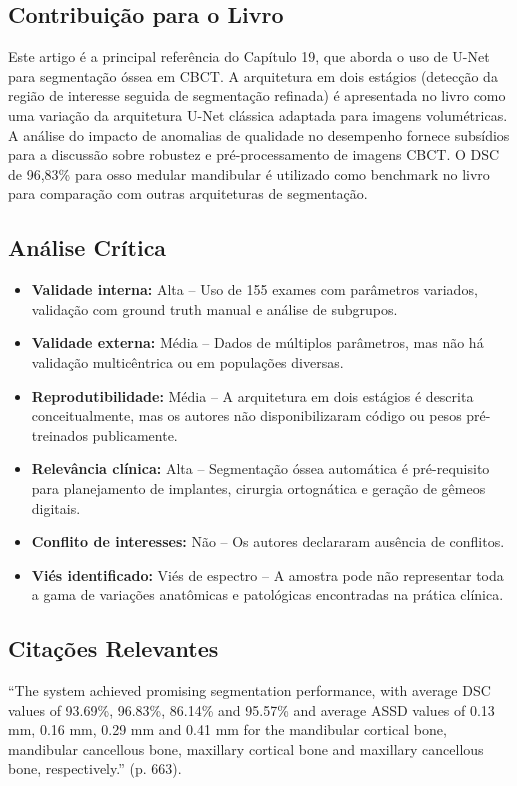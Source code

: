 \subsection{Contribuição para o Livro}
Este artigo é a principal referência do Capítulo 19, que aborda o uso de U-Net
para segmentação óssea em CBCT. A arquitetura em dois estágios (detecção da
região de interesse seguida de segmentação refinada) é apresentada no livro
como uma variação da arquitetura U-Net clássica adaptada para imagens
volumétricas. A análise do impacto de anomalias de qualidade no desempenho
fornece subsídios para a discussão sobre robustez e pré-processamento de
imagens CBCT. O DSC de 96,83\% para osso medular mandibular é utilizado como
benchmark no livro para comparação com outras arquiteturas de segmentação.

\subsection{Análise Crítica}
\begin{itemize}
  \item \textbf{Validade interna:} Alta -- Uso de 155 exames com parâmetros
        variados, validação com ground truth manual e análise de subgrupos.
  \item \textbf{Validade externa:} Média -- Dados de múltiplos parâmetros, mas
        não há validação multicêntrica ou em populações diversas.
  \item \textbf{Reprodutibilidade:} Média -- A arquitetura em dois estágios é
        descrita conceitualmente, mas os autores não disponibilizaram código
        ou pesos pré-treinados publicamente.
  \item \textbf{Relevância clínica:} Alta -- Segmentação óssea automática é
        pré-requisito para planejamento de implantes, cirurgia ortognática e
        geração de gêmeos digitais.
  \item \textbf{Conflito de interesses:} Não -- Os autores declararam ausência de
        conflitos.
  \item \textbf{Viés identificado:} Viés de espectro -- A amostra pode não
        representar toda a gama de variações anatômicas e patológicas
        encontradas na prática clínica.
\end{itemize}

\subsection{Citações Relevantes}
\begin{citacao}
``The system achieved promising segmentation performance, with average DSC
values of 93.69\%, 96.83\%, 86.14\% and 95.57\% and average ASSD values of
0.13 mm, 0.16 mm, 0.29 mm and 0.41 mm for the mandibular cortical bone,
mandibular cancellous bone, maxillary cortical bone and maxillary cancellous
bone, respectively.'' (p. 663).
\end{citacao}

